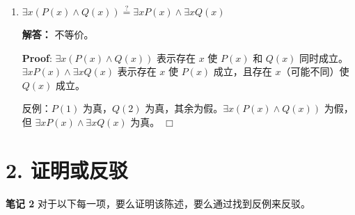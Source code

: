 \documentclass[11pt]{article}
\newenvironment{qparts}{\begin{enumerate}[{(}a{)}]}{\end{enumerate}}
\def\endproofmark{$\Box$}
\newenvironment{proof}{\par{\bf Proof}:}{\endproofmark\smallskip}
\begin{document}
\begin{qparts}
\item $\exists x (P(x) \wedge Q(x)) \stackrel{?}{=} \exists x P(x) \wedge \exists x Q(x)$

\textbf{解答：} 不等价。\par
\begin{proof}
$\exists x (P(x) \wedge Q(x))$ 表示存在 $x$ 使 $P(x)$ 和 $Q(x)$ 同时成立。
$\exists x P(x) \wedge \exists x Q(x)$ 表示存在 $x$ 使 $P(x)$ 成立，且存在 $x$（可能不同）使 $Q(x)$ 成立。

反例：$P(1)$ 为真，$Q(2)$ 为真，其余为假。$\exists x (P(x) \wedge Q(x))$ 为假，但 $\exists x P(x) \wedge \exists x Q(x)$ 为真。
\end{proof}
\end{qparts}

\section*{2. 证明或反驳}
\textbf{笔记 2} 对于以下每一项，要么证明该陈述，要么通过找到反例来反驳。
\end{document}
